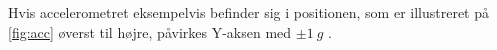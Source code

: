 \noindent
Hvis accelerometret eksempelvis befinder sig i positionen, som er illustreret på \autoref{fig:acc} øverst til højre, påvirkes Y-aksen med $\pm 1~g$ \citep{clifford2005}. 
